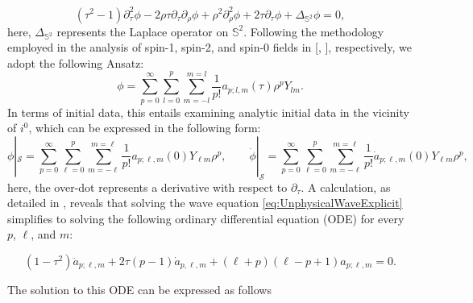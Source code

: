 \begin{equation}\label{eq:UnphysicalWaveExplicit}
  \left(\tau^2-1\right) \partial_\tau^2 \phi-2 \rho \tau \partial_\tau \partial_\rho \phi+\rho^2 \partial_\rho^2 \phi+2 \tau \partial_\tau \phi+\Delta_{\mathbb{S}^2} \phi=0,
\end{equation}
here, $\Delta _{\mathbb{S}^{2}{}}{}$ represents the Laplace operator on $\mathbb{S}^2$. Following the methodology employed in the analysis of spin-1, spin-2, and spin-0 fields in [\cite{ValAli22}, \cite{MinMacKro22}], respectively, we adopt the following Ansatz:
\begin{equation}\label{eq:ansatz}
	\phi = \sum_{p = 0}^{\infty}\sum_{l = 0}^{p}\sum_{m = -l}^{m = l}\frac{1}{p!}a_{p;l,m}(\tau)\rho^{p}Y_{lm}.
\end{equation}
In terms of initial data, this entails examining analytic initial data in the vicinity of $i^0$, which can be expressed in the following form:
\begin{equation}\label{eq:ID_field}
  \phi|_{\mathcal{S}} =
  \sum_{p=0}^{\infty}
  \sum_{\ell=0}^{p}\sum_{m=-\ell}^{m=\ell}\frac{1}{p!}a_{p;\ell,m}(0)Y_{\ell
    m}\rho^p, \qquad \dot{\phi}|_{\mathcal{S}} =
  \sum_{p=0}^{\infty}\sum_{\ell=0}^{p}\sum_{m=-\ell}^{m=\ell}
  \frac{1}{p!}\dot{a}_{p;\ell,m}(0)Y_{\ell
    m}\rho^p,
\end{equation}
here, the over-dot represents a derivative with respect to $\partial_\tau$. A calculation, as detailed in \cite{MinMacKro22}, reveals that solving the wave equation \eqref{eq:UnphysicalWaveExplicit} simplifies to solving the following ordinary differential equation (ODE) for every $p$, $\ell$, and $m$:

\begin{equation}\label{eq:ODE_wave_JacobiPoly}
  (1-\tau^2)\ddot{a}_{p;\ell,m} +
    2\tau(p-1)\dot{a}_{p,\ell,m}+(\ell+p)(\ell-p+1){a}_{p;\ell,m}=0.
\end{equation}

\noindent The solution to this ODE can be expressed as follows

